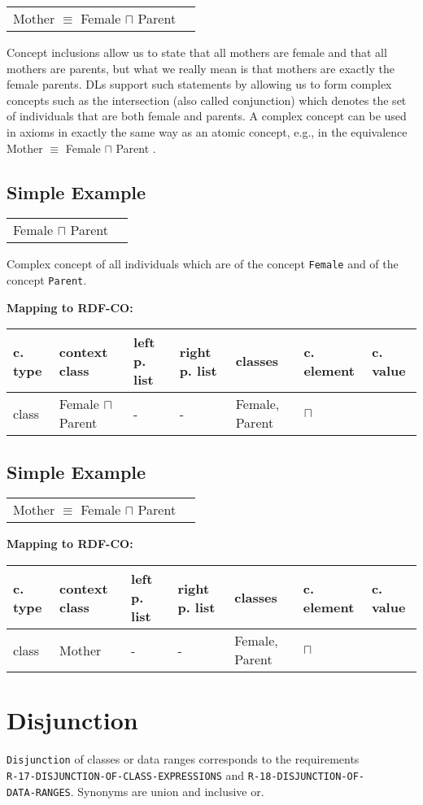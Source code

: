 \documentclass{llncs}
\newcommand{\ms}[1]{\texttt{#1}}
\newenvironment{gcotable}{
  \scriptsize
  \sffamily
  \vspace{0cm}
	\begin{center}
	\textbf{\vspace{0.4cm}Mapping to RDF-CO:} \\
  \begin{tabular}{l|l|l|l|l|l|l}
	\hline
  \textbf{c. type} & \textbf{context class} & \textbf{left p. list} & \textbf{right p. list} & \textbf{classes} & \textbf{c. element} & \textbf{c. value} \\
  \hline

}{
  \hline
  \end{tabular}
	\end{center}
}
\newenvironment{DL}{
  \vspace{0cm}
	\begin{center}
  \begin{tabular}{r l}

}{
  \end{tabular}
	\end{center}
}
\begin{document}
\begin{DL}
Mother $\equiv$ Female $\sqcap$ Parent
\end{DL}

Concept inclusions allow us to state that all mothers are female and that
all mothers are parents, but what we really mean is that mothers are exactly the female
parents. DLs support such statements by allowing us to form complex concepts such as
the intersection (also called conjunction)
which denotes the set of individuals that are both female and parents. A complex concept
can be used in axioms in exactly the same way as an atomic concept, e.g., in the
equivalence Mother $\equiv$ Female $\sqcap$ Parent .

\subsection{Simple Example}

\begin{DL}
Female $\sqcap$ Parent
\end{DL}

Complex concept of all individuals which are of the concept \ms{Female} and of the concept \ms{Parent}.

\begin{gcotable}
class & Female $\sqcap$ Parent & - & - & Female, Parent & $\sqcap$ \\
\end{gcotable}

\subsection{Simple Example}

\begin{DL}
Mother $\equiv$ Female $\sqcap$ Parent
\end{DL}

\begin{gcotable}
class & Mother & - & - & Female, Parent & $\sqcap$ \\
\end{gcotable}

\section{Disjunction}

\ms{Disjunction} of classes or data ranges corresponds to the requirements \\
\ms{R-17-DISJUNCTION-OF-CLASS-EXPRESSIONS} and \ms{R-18-DISJUNCTION-OF-} \\
\ms{DATA-RANGES}.
Synonyms are union and inclusive or.
\end{document}

